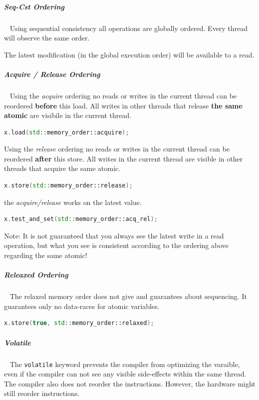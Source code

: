 \documentclass[11pt,twoside,landscape]{article}
\begin{document}
\begin{multicols}{2}
\subparagraph{Seq-Cst Ordering} \
\label{sec:orgfa65608}
Using sequential consistency all operations are globally ordered.
Every thread will observe the same order.

The latest modification (in the global execution order) will be available to a read.

\subparagraph{Acquire / Release Ordering} \
\label{sec:orge06b5bb}
Using the \emph{acquire} ordering no reads or writes in the current thread can be reordered \textbf{before} this load.
All writes in other threads that release \textbf{the same atomic} are visibile in the current thread.

\begin{lstlisting}[language=c++,numbers=none]
x.load(std::memory_order::acquire);
\end{lstlisting}

Using the \emph{release} ordering no reads or writes in the current thread can be reordered \textbf{after} this store.
All writes in the current thread are visible in other threads that acquire the same atomic.

\begin{lstlisting}[language=c++,numbers=none]
x.store(std::memory_order::release);
\end{lstlisting}

the \emph{acquire/release} works on the latest value.
\begin{lstlisting}[language=c++,numbers=none]
x.test_and_set(std::memory_order::acq_rel);
\end{lstlisting}

Note: It is not guaranteed that you always see the latest write in a read operation, but what you see is consistent according to the ordering above regarding the same atomic!

\subparagraph{Releaxed Ordering} \
\label{sec:orge67a01e}
The relaxed memory order does not give and guarantees about sequencing.
It guarantees only no data-races for atomic variables.

\begin{lstlisting}[language=c++,numbers=none]
x.store(true, std::memory_order::relaxed);
\end{lstlisting}

\subparagraph{Volatile} \
\label{sec:orgaf0ed52}
The \texttt{volatile} keyword prevents the compiler from optimizing the varaible, even if the compiler can not see any visible side-effects within the same thread.
The compiler also does not reorder the instructions.
However, the hardware might still reorder instructions.


\end{multicols}
\end{document}
